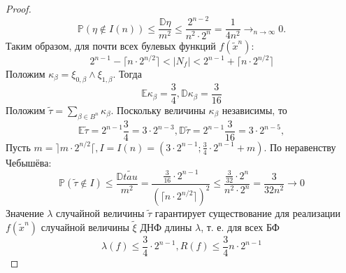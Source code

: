 \documentclass[11pt]{article}
\newcounter{th}\setcounter{th}{0}
\begin{document}
\begin{proof}
\begin{equation*}
\mathbb{P}(\eta \notin I(n)) \leq \frac{\mathbb{D}\eta}{m^2} \leq \frac{2^{n - 2}}{n^2\cdot2^n} =
\frac1{4n^2} \to_{n \to \infty} 0.
\end{equation*}
Таким образом, для почти всех булевых функций $f(\tilde{x}^n)$:
\begin{equation*}
2^{n - 1} - \lceil n\cdot2^{n/2}\rceil < |N_f| < 2^{n - 1} + \lceil n\cdot2^{n/2}\rceil
\end{equation*}
Положим $\kappa_{\beta} = \xi_{0, \beta} \wedge \xi_{1, \beta}$. Тогда
\begin{equation}
\mathbb{E}\kappa_{\beta} = \frac34, \mathbb{D}\kappa_{\beta} = \frac3{16}
\end{equation}
Положим $\tilde{\tau} = \sum_{\beta \in B^n}\kappa_{\beta}$. Поскольку величины $\kappa_{\beta}$
независимы, то
\begin{equation}
\mathbb{E}\tilde{\tau} = 2^{n - 1}\frac34 = 3\cdot2^{n - 3},
\mathbb{D}\tilde{\tau} = 2^{n - 1}\frac3{16} = 3\cdot2^{n - 5},
\end{equation}
Пусть $m = \rceil m\cdot2^{n/2}\lceil, I = I(n) = (3\cdot2^{n - 1}; \frac34\cdot2^{n - 1} + m)$.
По неравенству Чебышёва:
\begin{equation}
\mathbb{P}(\tilde{\tau} \notin I) \leq \frac{\mathbb{D}\tilde{tau}}{m^2} =
\frac{\frac3{16}\cdot2^{n - 1}}{(\lceil n\cdot2^{n/2}\rceil)^2} \leq \frac{\frac3{32}\cdot2^n}{n^2\cdot2^n}
= \frac3{32n^2} \to 0
\end{equation}
Значение $\lambda$ случайной величины $\tilde{\tau}$ гарантирует существование для реализации
$f(\tilde{x}^n)$ случайной величины $\tilde{\xi}$ ДНФ длины $\lambda$, т. е. для всех БФ
\begin{equation}
\lambda(f) \leq \frac34\cdot2^{n - 1}, R(f) \leq \frac34n\cdot2^{n - 1}
\end{equation}
\end{proof}
\end{document}
